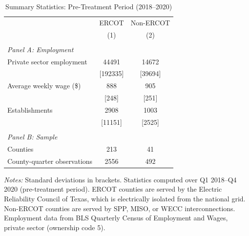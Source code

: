 \begin{table}[htbp]
\centering
\caption{Summary Statistics: Pre-Treatment Period (2018--2020)}
\label{tab:summary}
\begin{tabular}{lcc}
\hline\hline
 & ERCOT & Non-ERCOT \\
 & (1) & (2) \\
\hline
\\[-6pt]
\multicolumn{3}{l}{\textit{Panel A: Employment}} \\[3pt]
Private sector employment & 44491 & 14672 \\
 & [192335] & [39694] \\[6pt]
Average weekly wage (\$) & 888 & 905 \\
 & [248] & [251] \\[6pt]
Establishments & 2908 & 1003 \\
 & [11151] & [2525] \\[6pt]
\\[-6pt]
\multicolumn{3}{l}{\textit{Panel B: Sample}} \\[3pt]
Counties & 213 & 41 \\
County-quarter observations & 2556 & 492 \\
\hline\hline
\end{tabular}
\begin{tablenotes}
\small
\item \textit{Notes:} Standard deviations in brackets. Statistics computed over Q1 2018--Q4 2020 (pre-treatment period). ERCOT counties are served by the Electric Reliability Council of Texas, which is electrically isolated from the national grid. Non-ERCOT counties are served by SPP, MISO, or WECC interconnections. Employment data from BLS Quarterly Census of Employment and Wages, private sector (ownership code 5).
\end{tablenotes}
\end{table}

